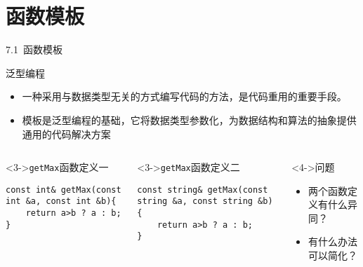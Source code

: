 
\section{函数模板}




\begin{frame}[fragile]{7.1~函数模板}
\vspace{-4mm}
\begin{block}{泛型编程}
\begin{itemize}
  \item 一种采用与数据类型无关的方式编写代码的方法，是\alert{代码重用}的重要手段。
  \item <3->\alert{模板}是泛型编程的基础，它将数据类型参数化，为数据结构和算法的\alert{抽象}提供\alert{通用的代码}解决方案
\end{itemize}

\end{block}


\vspace{-4mm}

\begin{columns}[t]

\begin{blueblock}<3->{\texttt{getMax}函数定义一}
\vspace{-1.5mm}\begin{lstlisting}
const int& getMax(const int &a, const int &b){
    return a>b ? a : b;
}
\end{lstlisting}\vspace{-1.5mm}
\end{blueblock}
\vspace{-2mm}
\begin{blueblock}<3->{\texttt{getMax}函数定义二}
\vspace{-1.5mm}\begin{lstlisting}
const string& getMax(const string &a, const string &b){
    return a>b ? a : b;
}
\end{lstlisting}\vspace{-1.5mm}
\end{blueblock}

\begin{greenblock}<4->{问题}
\begin{itemize}
  \item 两个函数定义有什么异同？
  \item <5-> 有什么办法可以简化？
\end{itemize}

\end{greenblock}

\end{columns}

\end{frame}

